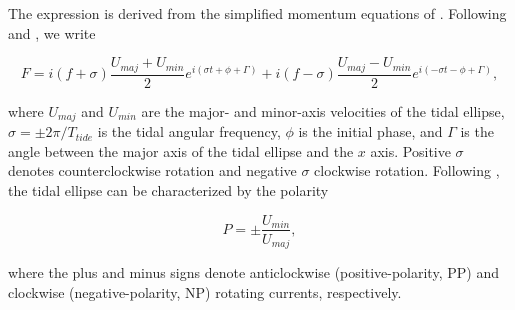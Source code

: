 \documentclass[draft]{agujournal2019}
\begin{document}
 The expression is derived from the simplified momentum equations of . Following  and , we write
\begin{linenomath*}
\begin{equation}
F=i(f+\sigma)\frac{U_{maj}+U_{min}}{2}e^{i(\sigma t+\phi+\Gamma)}+i(f-\sigma)\frac{U_{maj}-U_{min}}{2}e^{i(-\sigma t-\phi+\Gamma)} ,
\label{eq:tide_forcing}
\end{equation}
\end{linenomath*}
where $U_{maj}$ and $U_{min}$ are the major- and minor-axis velocities of the tidal ellipse, $\sigma=\pm2\pi/T_{tide}$ is the tidal angular frequency, $\phi$ is the initial phase, and $\Gamma$ is the angle between the major axis of the tidal ellipse and the $x$ axis. Positive $\sigma$ denotes counterclockwise rotation and negative $\sigma$ clockwise rotation. Following , the tidal ellipse can be characterized by the polarity
\begin{linenomath*}
\begin{equation}
P=\pm{\frac{U_{min}}{U_{maj}}} ,
\label{eq:polarity}
\end{equation}
\end{linenomath*}
where the plus and minus signs denote anticlockwise (positive-polarity, PP) and clockwise (negative-polarity, NP) rotating currents, respectively.
\end{document}
